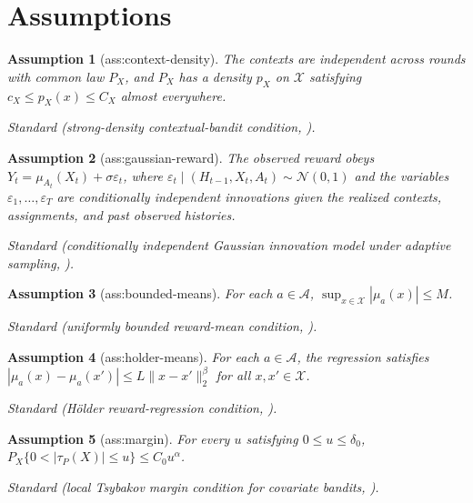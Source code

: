 \documentclass{article}
\newtheorem{assumption}{Assumption}
\begin{document}
\section{Assumptions}

\begin{assumption}[ass:context-density]\label{ass:context-density}
The contexts are independent across rounds with common law \(P_X\), and \(P_X\) has a density \(p_X\) on \(\mathcal X\) satisfying \(c_X\le p_X(x)\le C_X\) almost everywhere.
\par\smallskip\noindent\emph{Standard} (strong-density contextual-bandit condition, \cite{PerchetRigollet2013CovariateBandits}).
\end{assumption}

\begin{assumption}[ass:gaussian-reward]\label{ass:gaussian-reward}
The observed reward obeys \(Y_t=\mu_{A_t}(X_t)+\sigma\varepsilon_t\), where \(\varepsilon_t\mid(H_{t-1},X_t,A_t)\sim\mathcal N(0,1)\) and the variables \(\varepsilon_1,\ldots,\varepsilon_T\) are conditionally independent innovations given the realized contexts, assignments, and past observed histories.
\par\smallskip\noindent\emph{Standard} (conditionally independent Gaussian innovation model under adaptive sampling, \cite{KaufmannCappeGarivier2016Complexity}).
\end{assumption}

\begin{assumption}[ass:bounded-means]\label{ass:bounded-means}
For each \(a\in\mathcal A\), \(\sup_{x\in\mathcal X}|\mu_a(x)|\le M\).
\par\smallskip\noindent\emph{Standard} (uniformly bounded reward-mean condition, \cite{PerchetRigollet2013CovariateBandits}).
\end{assumption}

\begin{assumption}[ass:holder-means]\label{ass:holder-means}
For each \(a\in\mathcal A\), the regression satisfies \(|\mu_a(x)-\mu_a(x')|\le L\|x-x'\|_2^\beta\) for all \(x,x'\in\mathcal X\).
\par\smallskip\noindent\emph{Standard} (Hölder reward-regression condition, \cite{PerchetRigollet2013CovariateBandits}).
\end{assumption}

\begin{assumption}[ass:margin]\label{ass:margin}
For every \(u\) satisfying \(0\le u\le\delta_0\), \(P_X\{0<|\tau_P(X)|\le u\}\le C_0u^\alpha\).
\par\smallskip\noindent\emph{Standard} (local Tsybakov margin condition for covariate bandits, \cite{PerchetRigollet2013CovariateBandits}).
\end{assumption}
\end{document}
